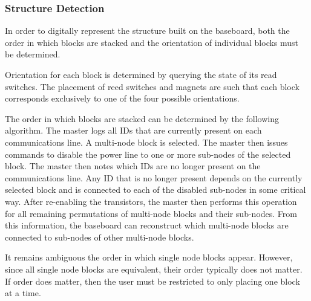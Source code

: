 \documentclass[]{article}
\begin{document}
\subsubsection{Structure Detection}
In order to digitally represent the structure built on the baseboard, both the order in which blocks are stacked and the orientation of individual blocks must be determined.

Orientation for each block is determined by querying the state of its read switches. The placement of reed switches and magnets are such that each block corresponds exclusively to one of the four possible orientations.

The order in which blocks are stacked can be determined by the following algorithm. The master logs all IDs that are currently present on each communications line. A multi-node block is selected. The master then issues commands to disable the power line to one or more sub-nodes of the selected block. The master then notes which IDs are no longer present on the communications line. Any ID that is no longer present depends on the currently selected block and is connected to each of the disabled sub-nodes in some critical way. After re-enabling the transistors, the master then performs this operation for all remaining permutations of multi-node blocks and their sub-nodes. From this information, the baseboard can reconstruct which multi-node blocks are connected to sub-nodes of other multi-node blocks.

It remains ambiguous the order in which single node blocks appear. However, since all single node blocks are equivalent, their order typically does not matter. If order does matter, then the user must be restricted to only placing one block at a time.
\end{document}

